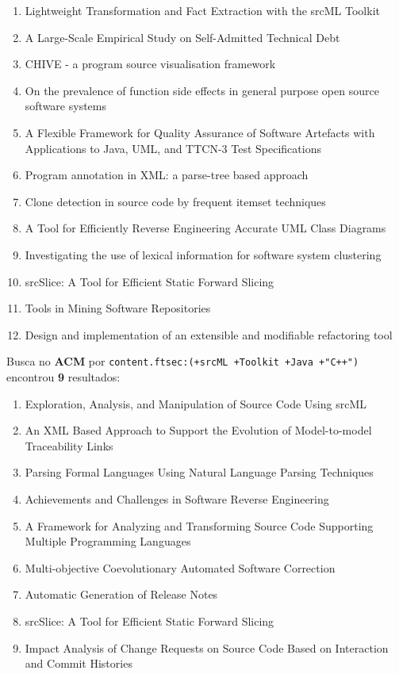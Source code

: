 \begin{enumerate}
\item Lightweight Transformation and Fact Extraction with the srcML Toolkit
\item A Large-Scale Empirical Study on Self-Admitted Technical Debt
\item CHIVE - a program source visualisation framework
\item On the prevalence of function side effects in general purpose open source software systems
\item A Flexible Framework for Quality Assurance of Software Artefacts with Applications to Java, UML, and TTCN-3 Test Specifications
\item Program annotation in XML: a parse-tree based approach
\item Clone detection in source code by frequent itemset techniques
\item A Tool for Efficiently Reverse Engineering Accurate UML Class Diagrams
\item Investigating the use of lexical information for software system clustering
\item srcSlice: A Tool for Efficient Static Forward Slicing
\item Tools in Mining Software Repositories
\item Design and implementation of an extensible and modifiable refactoring tool
\end{enumerate}

Busca no {\bf ACM} por
\texttt{content.ftsec:(+srcML +Toolkit +Java +"C++")}
encontrou {\bf 9}
resultados:

\begin{enumerate}
\item Exploration, Analysis, and Manipulation of Source Code Using srcML
\item An XML Based Approach to Support the Evolution of Model-to-model Traceability Links
\item Parsing Formal Languages Using Natural Language Parsing Techniques
\item Achievements and Challenges in Software Reverse Engineering
\item A Framework for Analyzing and Transforming Source Code Supporting Multiple Programming Languages
\item Multi-objective Coevolutionary Automated Software Correction
\item Automatic Generation of Release Notes
\item srcSlice: A Tool for Efficient Static Forward Slicing
\item Impact Analysis of Change Requests on Source Code Based on Interaction and Commit Histories
\end{enumerate}

